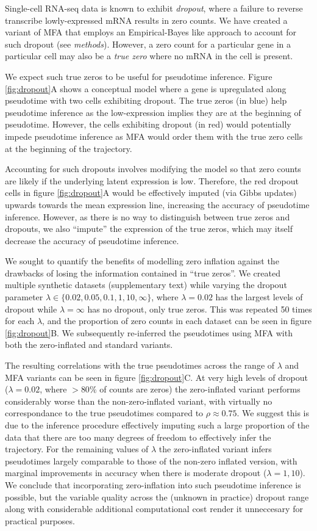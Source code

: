 Single-cell RNA-seq data is known to exhibit \emph{dropout}, where a failure to reverse transcribe lowly-expressed mRNA results in zero counts. We have created a variant of MFA that employs an Empirical-Bayes like approach to account for such dropout (see \emph{methods}). However, a zero count for a particular gene in a particular cell may also be a \emph{true zero} where no mRNA in the cell is present.

We expect such true zeros to be useful for pseudotime inference. Figure \ref{fig:dropout}A shows a conceptual model where a gene is upregulated along pseudotime with two cells exhibiting dropout. The true zeros (in blue) help pseudotime inference as the low-expression implies they are at the beginning of pseudotime. However, the cells exhibiting dropout (in red) would potentially impede pseudotime inference as MFA would order them with the true zero cells at the beginning of the trajectory.

Accounting for such dropouts involves modifying the model so that zero counts are likely if the underlying latent expression is low. Therefore, the red dropout cells in figure \ref{fig:dropout}A would be effectively imputed (via Gibbs updates) upwards towards the mean expression line, increasing the accuracy of pseudotime inference. However, as there is no way to distinguish between true zeros and dropouts, we also ``impute'' the expression of the true zeros, which may itself decrease the accuracy of pseudotime inference.

We sought to quantify the benefits of modelling zero inflation against the drawbacks of losing the information contained in ``true zeros''. We created multiple synthetic datasets (supplementary text) while varying the dropout parameter $\lambda \in \{0.02, 0.05, 0.1, 1, 10, \infty\}$, where $\lambda = 0.02$ has the largest levels of dropout while $\lambda = \infty$ has no dropout, only true zeros. This was repeated 50 times for each $\lambda$, and the proportion of zero counts in each dataset can be seen in figure \ref{fig:dropout}B. We subsequently re-inferred the pseudotimes using MFA with both the zero-inflated and standard variants.

The resulting correlations with the true pseudotimes across the range of $\lambda$ and MFA variants can be seen in figure \ref{fig:dropout}C. At very high levels of dropout ($\lambda = 0.02$, where $>80\%$ of counts are zeros) the zero-inflated variant performs considerably worse than the non-zero-inflated variant, with virtually no correspondance to the true pseudotimes compared to $\rho \approx 0.75$. We suggest this is due to the inference procedure effectively imputing such a large proportion of the data that there are too many degrees of freedom to effectively infer the trajectory. For the remaining values of $\lambda$ the zero-inflated variant infers pseudotimes largely comparable to those of the non-zero inflated version, with marginal improvements in accuracy when there is moderate dropout ($\lambda = 1, 10$). We conclude that incorporating zero-inflation into such pseudotime inference is possible, but the variable quality across the (unknown in practice) dropout range along with considerable additional computational cost render it unneccesary for practical purposes.

